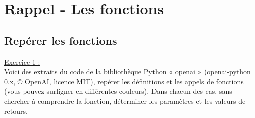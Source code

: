 \chapter*{Rappel - Les fonctions}

\section*{Repérer les fonctions}

\underline{Exercice 1 :}\\

Voici des extraits du code de la bibliothèque Python « openai » (openai-python 0.x, © OpenAI, licence MIT), repérer les définitions et les appels de fonctions (vous pouvez surligner en différentes couleurs).
Dans chacun des cas, sans chercher à comprendre la fonction, déterminer les paramètres et les valeurs de retours.\\
